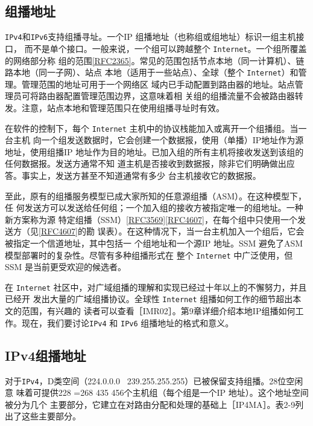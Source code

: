 \subsection{组播地址}

\verb|IPv4|和\verb|IPv6|支持组播寻址。一个IP 组播地址（也称组或组地址）标识一组主机接口，
而不是单个接口。一般来说，一个组可以跨越整个 \verb|Internet|。一个组所覆盖的网络部分称
组的范围\href{https://www.rfc-editor.org/rfc/rfc2365}{[RFC2365]}。常见的范围包括节点本地（同一计算机）、链路本地（同一子网）、站点
本地（适用于一些站点）、全球（整个 \verb|Internet|）和管理。管理范围的地址可用于一个网络区
域内已手动配置到路由器的地址。站点管理员可将路由器配置管理范围边界，这意味着相
关组的组播流量不会被路由器转发。注意，站点本地和管理范围只在使用组播寻址时有效。

在软件的控制下，每个 \verb|Internet| 主机中的协议栈能加入或离开一个组播组。当一台主机
向一个组发送数据时，它会创建一个数据报，使用（单播）IP地址作为源地址，使用组播IP
地址作为目的地址。已加入组的所有主机将接收发送到该组的任何数据报。发送方通常不知
道主机是否接收到数据报，除非它们明确做出应答。事实上，发送方甚至不知道通常有多少
台主机接收它的数据报。

至此，原有的组播服务模型已成大家所知的任意源组播（ASM）。在这种模型下，任
何发送方可以发送给任何组；一个加入组的接收方被指定唯一的组地址。一种新方案称为源
特定组播（SSM）\href{https://www.rfc-editor.org/rfc/rfc3569}{[RFC3569]}\href{https://www.rfc-editor.org/rfc/rfc4607}{[RFC4607]}，在每个组中只使用一个发送方（见\href{https://www.rfc-editor.org/rfc/rfc4607}{[RFC4607]}的勘
误表）。在这种情况下，当一台主机加入一个组后，它会被指定一个信道地址，其中包括一
个组地址和一个源IP 地址。SSM 避免了ASM模型部署时的复杂性。尽管有多种组播形式在
整个 \verb|Internet| 中广泛使用，但SSM 是当前更受欢迎的候选者。

在 \verb|Internet| 社区中，对广域组播的理解和实现已经过十年以上的不懈努力，并且已经开
发出大量的广域组播协议。全球性 \verb|Internet| 组播如何工作的细节超出本文的范围，有兴趣的
读者可以查看［IMR02］。第9章详细介绍本地IP组播如何工作。现在，我们要讨论\verb|IPv4| 和
\verb|IPv6| 组播地址的格式和意义。

\subsection{IPv4组播地址}
对于\verb|IPv4|，D类空间（224.0.0.0 ~239.255.255.255）已被保留支持组播。28位空闲意
味着可提供228 =268 435 456个主机组（每个组是一个IP 地址）。这个地址空间被分为几个
主要部分，它建立在对路由分配和处理的基础上［IP4MA］。表2-9列出了这些主要部分。

